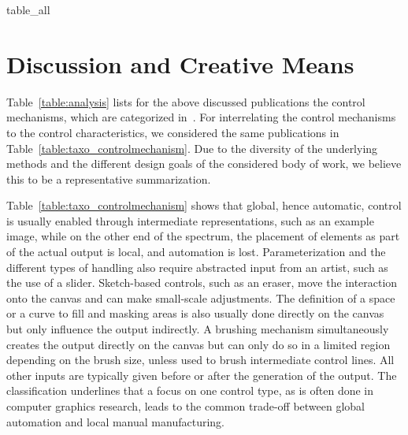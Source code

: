 
{table_all}




\section{Discussion and Creative Means}
\label{sec:discussion_creative_means}

Table~\ref{table:analysis} lists for the above discussed publications the control mechanisms, which are categorized in~. For interrelating the control mechanisms to the control characteristics, we considered the same publications in Table~\ref{table:taxo_controlmechanism}. Due to the diversity of the underlying methods and the different design goals of the considered body of work, we believe this to be a representative summarization.

Table~\ref{table:taxo_controlmechanism} shows that global, hence automatic, control is usually enabled through intermediate representations, such as an example image, while on the other end of the spectrum, the placement of elements as part of the actual output is local, and automation is lost. Parameterization and the different types of handling also require abstracted input from an artist, such as the use of a slider. Sketch-based controls, such as an eraser, move the interaction onto the canvas and can make small-scale adjustments. The definition of a space or a curve to fill and masking areas is also usually done directly on the canvas but only influence the output indirectly. A brushing mechanism simultaneously creates the output directly on the canvas but can only do so in a limited region depending on the brush size, unless used to brush intermediate control lines. All other inputs are typically given before or after the generation of the output. The classification underlines that a focus on one control type, as is often done in computer graphics research, leads to the common trade-off between global automation and local manual manufacturing.

